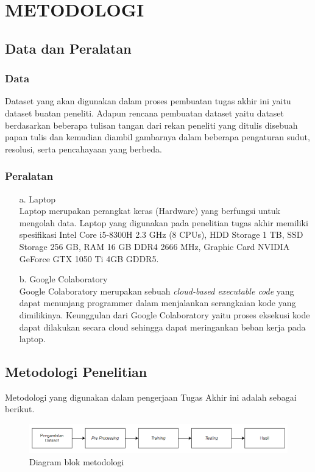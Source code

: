 \section{METODOLOGI}


\subsection{Data dan Peralatan}

\subsubsection{Data}
Dataset yang akan digunakan dalam proses pembuatan tugas akhir ini yaitu dataset buatan peneliti. Adapun rencana pembuatan dataset yaitu dataset berdasarkan beberapa tulisan tangan dari rekan peneliti yang ditulis disebuah papan tulis dan kemudian diambil gambarnya dalam beberapa pengaturan sudut, resolusi, serta pencahayaan yang berbeda.

\subsubsection{Peralatan}
\begin{itemize}
   \item [a.] Laptop \\
   Laptop merupakan perangkat keras (Hardware) yang berfungsi untuk mengolah data. Laptop yang digunakan pada penelitian tugas akhir memiliki spesifikasi Intel Core i5-8300H 2.3 GHz (8 CPUs), HDD Storage 1 TB, SSD Storage 256 GB, RAM 16 GB DDR4 2666 MHz, Graphic Card NVIDIA GeForce GTX 1050 Ti 4GB GDDR5.
   \item [b.] Google Colaboratory \\
   Google Colaboratory merupakan sebuah \textit{cloud-based executable code} yang dapat menunjang programmer dalam menjalankan serangkaian kode yang dimilikinya. Keunggulan dari Google Colaboratory yaitu proses eksekusi kode dapat dilakukan secara cloud sehingga dapat meringankan beban kerja pada laptop.
\end{itemize}
   

\subsection{Metodologi Penelitian}
Metodologi yang digunakan dalam pengerjaan Tugas Akhir ini adalah sebagai berikut.
    \begin{figure} [H] \centering
      \includegraphics[scale=0.6]{gambar/Metodologi.png}
      \caption{Diagram blok metodologi}
      \label{fig:Metodologi}
    \end{figure}

